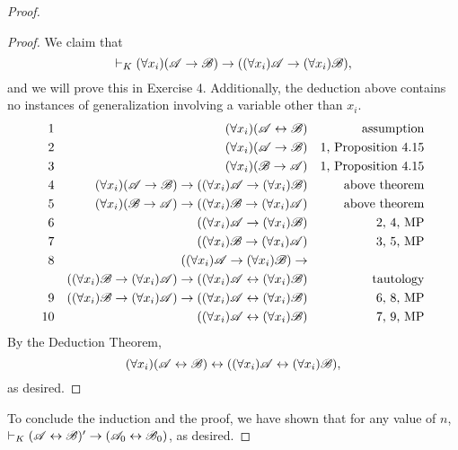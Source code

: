 \begin{proposition}
\begin{proof}
\begin{enumerate}
\begin{lemma*}
          \begin{proof}
            We claim that
              \[\vdash_{K} (\forall x_i)(\mathscr{A} \rightarrow \mathscr{B}) \rightarrow ((\forall x_i)\mathscr{A} \rightarrow (\forall x_i)\mathscr{B}),\]
            and we will prove this in Exercise 4. Additionally, the deduction above contains no instances of generalization involving a variable other than \(x_i\).
            \begin{align*}
              \text{1}&&
              (\forall x_i)(\mathscr{A} \leftrightarrow \mathscr{B})&&
              \text{assumption}\\
              \text{2}&&
              (\forall x_i)(\mathscr{A} \rightarrow \mathscr{B})&&
              \text{1, Proposition 4.15}\\
              \text{3}&&
              (\forall x_i)(\mathscr{B} \rightarrow \mathscr{A})&&
              \text{1, Proposition 4.15}\\
              \text{4}&&
              (\forall x_i)(\mathscr{A} \rightarrow \mathscr{B}) \rightarrow ((\forall x_i)\mathscr{A} \rightarrow (\forall x_i)\mathscr{B})&&
              \text{above theorem}\\
              \text{5}&&
              (\forall x_i)(\mathscr{B} \rightarrow \mathscr{A}) \rightarrow ((\forall x_i)\mathscr{B} \rightarrow (\forall x_i)\mathscr{A})&&
              \text{above theorem}\\
              \text{6}&&
              ((\forall x_i)\mathscr{A} \rightarrow (\forall x_i)\mathscr{B})&&
              \text{2, 4, MP}\\
              \text{7}&&
              ((\forall x_i)\mathscr{B} \rightarrow (\forall x_i)\mathscr{A})&&
              \text{3, 5, MP}\\
              \text{8}&&
              ((\forall x_i)\mathscr{A} \rightarrow (\forall x_i)\mathscr{B}) \rightarrow&&
              \\
              &&
              ((\forall x_i)\mathscr{B} \rightarrow (\forall x_i)\mathscr{A}) \rightarrow ((\forall x_i)\mathscr{A} \leftrightarrow (\forall x_i)\mathscr{B})&&
              \text{tautology}\\
              \text{9}&&
              ((\forall x_i)\mathscr{B} \rightarrow (\forall x_i)\mathscr{A}) \rightarrow ((\forall x_i)\mathscr{A} \leftrightarrow (\forall x_i)\mathscr{B})&&
              \text{6, 8, MP}\\
              \text{10}&&
              ((\forall x_i)\mathscr{A} \leftrightarrow (\forall x_i)\mathscr{B})&&
              \text{7, 9, MP}
            \end{align*}
          By the Deduction Theorem,
            \[(\forall x_i)(\mathscr{A} \leftrightarrow \mathscr{B}) \leftrightarrow ((\forall x_i)\mathscr{A} \leftrightarrow (\forall x_i)\mathscr{B}),\]
          as desired.
          \end{proof}
        \end{lemma*}
    \end{enumerate}

    To conclude the induction and the proof, we have shown that for any value of \(n\), \(\vdash_{K} (\mathscr{A} \leftrightarrow \mathscr{B})' \rightarrow (\mathscr{A}_0 \leftrightarrow \mathscr{B}_0)\), as desired.
  \end{proof}
\end{proposition}

